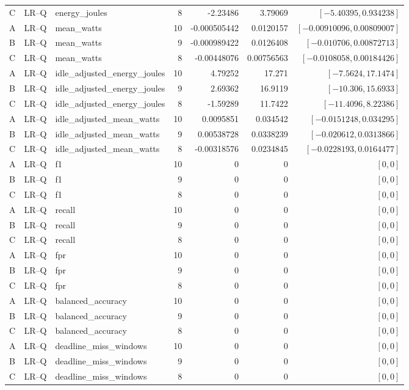 \begin{longtable}{lllrrrr}
C & LR--Q & energy\_joules & 8 & -2.23486 & 3.79069 & $[-5.40395,0.934238]$\\
A & LR--Q & mean\_watts & 10 & -0.000505442 & 0.0120157 & $[-0.00910096,0.00809007]$\\
B & LR--Q & mean\_watts & 9 & -0.000989422 & 0.0126408 & $[-0.010706,0.00872713]$\\
C & LR--Q & mean\_watts & 8 & -0.00448076 & 0.00756563 & $[-0.0108058,0.00184426]$\\
A & LR--Q & idle\_adjusted\_energy\_joules & 10 & 4.79252 & 17.271 & $[-7.5624,17.1474]$\\
B & LR--Q & idle\_adjusted\_energy\_joules & 9 & 2.69362 & 16.9119 & $[-10.306,15.6933]$\\
C & LR--Q & idle\_adjusted\_energy\_joules & 8 & -1.59289 & 11.7422 & $[-11.4096,8.22386]$\\
A & LR--Q & idle\_adjusted\_mean\_watts & 10 & 0.0095851 & 0.034542 & $[-0.0151248,0.034295]$\\
B & LR--Q & idle\_adjusted\_mean\_watts & 9 & 0.00538728 & 0.0338239 & $[-0.020612,0.0313866]$\\
C & LR--Q & idle\_adjusted\_mean\_watts & 8 & -0.00318576 & 0.0234845 & $[-0.0228193,0.0164477]$\\
A & LR--Q & f1 & 10 & 0 & 0 & $[0,0]$\\
B & LR--Q & f1 & 9 & 0 & 0 & $[0,0]$\\
C & LR--Q & f1 & 8 & 0 & 0 & $[0,0]$\\
A & LR--Q & recall & 10 & 0 & 0 & $[0,0]$\\
B & LR--Q & recall & 9 & 0 & 0 & $[0,0]$\\
C & LR--Q & recall & 8 & 0 & 0 & $[0,0]$\\
A & LR--Q & fpr & 10 & 0 & 0 & $[0,0]$\\
B & LR--Q & fpr & 9 & 0 & 0 & $[0,0]$\\
C & LR--Q & fpr & 8 & 0 & 0 & $[0,0]$\\
A & LR--Q & balanced\_accuracy & 10 & 0 & 0 & $[0,0]$\\
B & LR--Q & balanced\_accuracy & 9 & 0 & 0 & $[0,0]$\\
C & LR--Q & balanced\_accuracy & 8 & 0 & 0 & $[0,0]$\\
A & LR--Q & deadline\_miss\_windows & 10 & 0 & 0 & $[0,0]$\\
B & LR--Q & deadline\_miss\_windows & 9 & 0 & 0 & $[0,0]$\\
C & LR--Q & deadline\_miss\_windows & 8 & 0 & 0 & $[0,0]$\\

\end{longtable}
